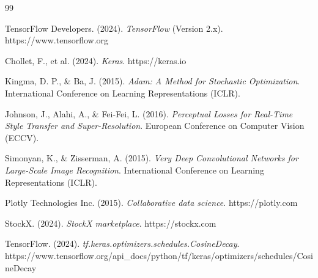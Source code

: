 \documentclass[11pt,a4paper]{article}
\begin{document}
\begin{thebibliography}{99}

TensorFlow Developers. (2024).
\textit{TensorFlow} (Version 2.x).
https://www.tensorflow.org

Chollet, F., et al. (2024).
\textit{Keras}.
https://keras.io

Kingma, D. P., \& Ba, J. (2015).
\textit{Adam: A Method for Stochastic Optimization}.
International Conference on Learning Representations (ICLR).

Johnson, J., Alahi, A., \& Fei-Fei, L. (2016).
\textit{Perceptual Losses for Real-Time Style Transfer and Super-Resolution}.
European Conference on Computer Vision (ECCV).

Simonyan, K., \& Zisserman, A. (2015).
\textit{Very Deep Convolutional Networks for Large-Scale Image Recognition}.
International Conference on Learning Representations (ICLR).

Plotly Technologies Inc. (2015).
\textit{Collaborative data science}.
https://plotly.com

StockX. (2024).
\textit{StockX marketplace}.
https://stockx.com

TensorFlow. (2024).
\textit{tf.keras.optimizers.schedules.CosineDecay}.
https://www.tensorflow.org/api\_docs/python/tf/keras/optimizers/schedules/CosineDecay

\end{thebibliography}
\end{document}
